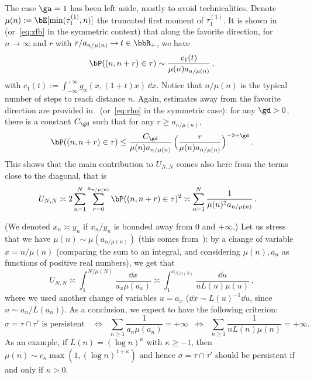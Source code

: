 \begin{appendix}
\begin{rema}\label{rem:alpha=1}
The case $\ga=1$ has been left aside, mostly to avoid technicalities. Denote $\mu(n):=\bE[\min(\tau_1^{(1)}, n)]$ the truncated first moment of $\tau_1^{(1)}$. It is shown in~\cite[Theorem~3.4]{cf:B} (or~\eqref{eq:zfb} in the symmetric context) that along the favorite direction, for $n\to \infty$ and $r$ with $r/a_{n/\mu(n)} \to t\in \bbR_+$, we have
\begin{equation}\label{alpha=1}
\bP((n,n+r)\in\tau) \sim \frac{c_1(t)}{\mu(n) a_{n/\mu(n)}}\,,
\end{equation}
with $c_1(t):= \int_{-\infty}^{+\infty} g_{\alpha}(x,(1+t)x)\, \dd x$. Notice that $n/\mu(n)$ is the typical number of steps to reach distance $n$. Again, estimates away from the favorite direction are provided in~\cite[Theorem~4.2]{cf:B} (or~\eqref{eq:rho} in the symmetric case): for any $\gd>0$, there is a constant $C_{\gd}$ such that for any $r \ge a_{n/\mu(n)}$,
\begin{equation}\label{alpha=1away}
\bP((n,n+r)\in\tau) \le \frac{C_{\gd}}{\mu(n) a_{n/\mu(n)}}\,\Big(\frac{r}{\mu(n) a_{n/\mu(n)}} \Big)^{-2+\gd}\,.
\end{equation}
This shows that the main contribution to $U_{N,N}$ comes also here from the terms close to the diagonal, that is
\begin{align*}
U_{N,N} &\asymp 2\sum_{n=1}^N \sum_{r=0}^{a_{n/\mu(n)}} \bP((n,n+r)\in\tau)^2 \asymp \sum_{n=1}^N \frac{1}{\mu(n)^2 a_{n/\mu(n)}}\,.
\end{align*}

(We denoted $x_n\asymp y_n$ if $x_n/y_n$ is bounded away from $0$ and $+\infty$.) Let us stress that we have $\mu(n) \sim \mu(a_{n/\mu(n)})$ (this comes from~\cite[Lemma~4.3]{cf:B17}): by a change of variable $x= n/\mu(n)$ (comparing the sum to an integral, and considering $\mu(n),a_n$ as functions of positive real numbers), we get that
\[
U_{N,N}\asymp \int_{1}^{N/\mu(N)} \frac{\dd x}{ a_{x} \mu(a_x)} \asymp \int_1^{a_{N/\mu(N)}} \frac{\dd u}{u L(u) \mu(u)}\,,
\]
where we used another change of variables $u \!=\!a_x$ ($\dd x \!\sim\! L(u)^{-1}\dd u$, since $n\!\sim\! a_n/L(a_n)$). As a conclusion, we expect to have the following criterion:
\[
\sigma=\tau\cap \tau' \text{ is persistent } \;\; \Longleftrightarrow \;\; \sum_{n\geq 1} \frac{1}{a_n \mu(a_n)} =+\infty \;\; \Longleftrightarrow \;\; \sum_{n\geq 1} \frac{1}{n L(n)\mu(n)} =+\infty.
\]
As an example, if $L(n) =(\log n)^{\kappa}$ with $\kappa \geq -1$, then $\mu(n) \sim c_{\kappa} \max(1, (\log n)^{1+\kappa})$ and hence $\sigma=\tau\cap \tau'$ should be persistent if and only if $\kappa>0$.
\end{rema}
\end{appendix}

